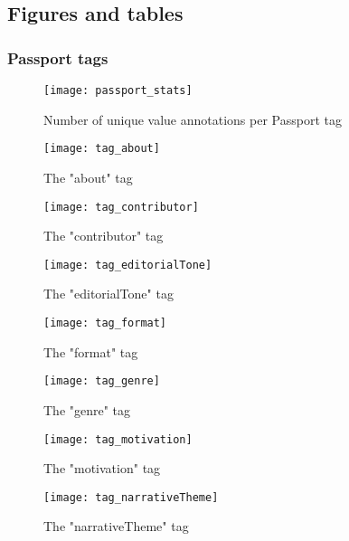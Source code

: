 \subsection{Figures and tables}

\subsubsection{Passport tags}

\begin{figure}[h]
  \centering
  \texttt{[image: passport\_stats]}
  \caption{Number of unique value annotations per Passport tag}
  \label{fig:passport_stats}
\end{figure}

\begin{figure}[h]
  \centering
  \texttt{[image: tag\_about]}
  \caption{The "about" tag}
  \label{fig:tag_about}
\end{figure}

\begin{figure}[h]
  \centering
  \texttt{[image: tag\_contributor]}
  \caption{The "contributor" tag}
  \label{fig:tag_contributor}
\end{figure}

\begin{figure}[h]
  \centering
  \texttt{[image: tag\_editorialTone]}
  \caption{The "editorialTone" tag}
  \label{fig:tag_editorialTone}
\end{figure}

\begin{figure}[h]
  \centering
  \texttt{[image: tag\_format]}
  \caption{The "format" tag}
  \label{fig:tag_format}
\end{figure}

\begin{figure}[h]
  \centering
  \texttt{[image: tag\_genre]}
  \caption{The "genre" tag}
  \label{fig:tag_genre}
\end{figure}

\begin{figure}[h]
  \centering
  \texttt{[image: tag\_motivation]}
  \caption{The "motivation" tag}
  \label{fig:tag_motivation}
\end{figure}

\begin{figure}[h]
  \centering
  \texttt{[image: tag\_narrativeTheme]}
  \caption{The "narrativeTheme" tag}
  \label{fig:tag_narrativeTheme}
\end{figure}

